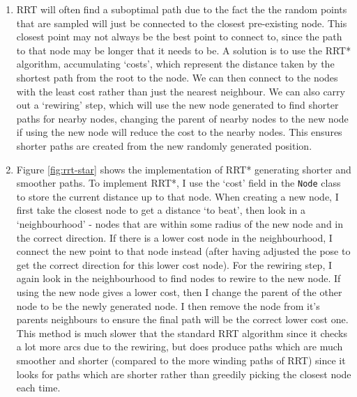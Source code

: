 \documentclass[12pt,a4paper]{article}
\begin{document}
\begin{enumerate}[label=(\alph*)]
	\item RRT will often find a suboptimal path due to the fact the the random points that are sampled will just be connected to the closest pre-existing node. This closest point may not always be the best point to connect to, since the path to that node may be longer that it needs to be. A solution is to use the RRT* algorithm, accumulating `costs', which represent the distance taken by the shortest path from the root to the node. We can then connect to the nodes with the least cost rather than just the nearest neighbour. We can also carry out a `rewiring' step, which will use the new node generated to find shorter paths for nearby nodes, changing the parent of nearby nodes to the new node if using the new node will reduce the cost to the nearby nodes. This ensures shorter paths are created from the new randomly generated position.
	\item Figure \ref{fig:rrt-star} shows the implementation of RRT* generating shorter and smoother paths. To implement RRT*, I use the `cost' field in the \texttt{Node} class to store the current distance up to that node. When creating a new node, I first take the closest node to get a distance `to beat', then look in a `neighbourhood' - nodes that are within some radius of the new node and in the correct direction. If there is a lower cost node in the neighbourhood, I connect the new point to that node instead (after having adjusted the pose to get the correct direction for this lower cost node). For the rewiring step, I again look in the neighbourhood to find nodes to rewire to the new node. If using the new node gives a lower cost, then I change the parent of the other node to be the newly generated node. I then remove the node from it's parents neighbours to ensure the final path will be the correct lower cost one. This method is much slower that the standard RRT algorithm since it checks a lot more arcs due to the rewiring, but does produce paths which are much smoother and shorter (compared to the more winding paths of RRT) since it looks for paths which are shorter rather than greedily picking the closest node each time.
	\begin{figure}[h!]
		\centering

\end{figure}
\end{enumerate}
\end{document}
